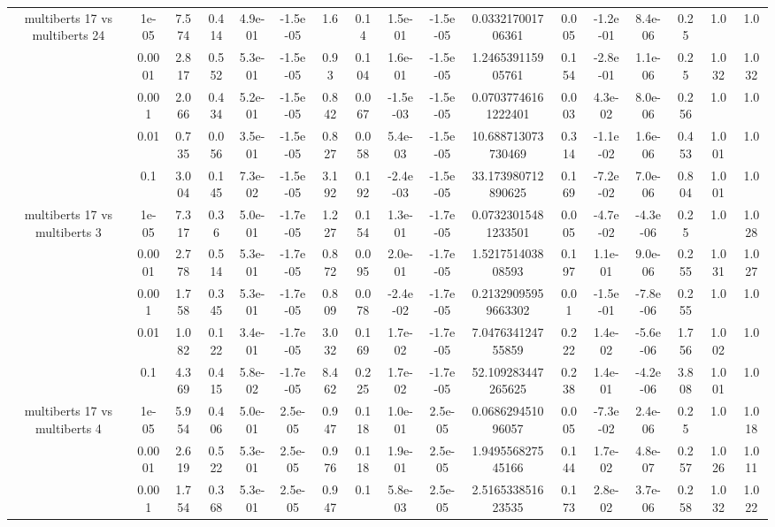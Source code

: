 \begin{tabular}{|c|c|c|c|c|c|c|c|c|c|c|c|c|c|c|c|c|}
\hline
\multirow{5}{*}{multiberts 17 vs multiberts 24} & 1e-05 & 7.574 & 0.414 & 4.9e-01 & -1.5e-05 & 1.6 & 0.14 & 1.5e-01 & -1.5e-05 & 0.033217001706361 & 0.005 & -1.2e-01 & 8.4e-06 & 0.25 & 1.0 & 1.0 \\
 & 0.0001 & 2.817 & 0.552 & 5.3e-01 & -1.5e-05 & 0.93 & 0.104 & 1.6e-01 & -1.5e-05 & 1.246539115905761 & 0.154 & -2.8e-01 & 1.1e-06 & 0.25 & 1.032 & 1.032 \\
 & 0.001 & 2.066 & 0.434 & 5.2e-01 & -1.5e-05 & 0.842 & 0.067 & -1.5e-03 & -1.5e-05 & 0.07037746161222401 & 0.003 & 4.3e-02 & 8.0e-06 & 0.256 & 1.0 & 1.0 \\
 & 0.01 & 0.735 & 0.056 & 3.5e-01 & -1.5e-05 & 0.827 & 0.058 & 5.4e-03 & -1.5e-05 & 10.688713073730469 & 0.314 & -1.1e-02 & 1.6e-06 & 0.453 & 1.001 & 1.0 \\
 & 0.1 & 3.004 & 0.145 & 7.3e-02 & -1.5e-05 & 3.192 & 0.192 & -2.4e-03 & -1.5e-05 & 33.173980712890625 & 0.169 & -7.2e-02 & 7.0e-06 & 0.804 & 1.001 & 1.0 \\
\hline
\multirow{5}{*}{multiberts 17 vs multiberts 3} & 1e-05 & 7.317 & 0.36 & 5.0e-01 & -1.7e-05 & 1.227 & 0.154 & 1.3e-01 & -1.7e-05 & 0.07323015481233501 & 0.005 & -4.7e-02 & -4.3e-06 & 0.25 & 1.0 & 1.028 \\
 & 0.0001 & 2.778 & 0.514 & 5.3e-01 & -1.7e-05 & 0.872 & 0.095 & 2.0e-01 & -1.7e-05 & 1.521751403808593 & 0.197 & 1.1e-01 & 9.0e-06 & 0.255 & 1.031 & 1.027 \\
 & 0.001 & 1.758 & 0.345 & 5.3e-01 & -1.7e-05 & 0.809 & 0.078 & -2.4e-02 & -1.7e-05 & 0.21329095959663302 & 0.01 & -1.5e-01 & -7.8e-06 & 0.255 & 1.0 & 1.0 \\
 & 0.01 & 1.082 & 0.122 & 3.4e-01 & -1.7e-05 & 3.032 & 0.169 & 1.7e-02 & -1.7e-05 & 7.047634124755859 & 0.222 & 1.4e-02 & -5.6e-06 & 1.756 & 1.002 & 1.0 \\
 & 0.1 & 4.369 & 0.415 & 5.8e-02 & -1.7e-05 & 8.462 & 0.225 & 1.7e-02 & -1.7e-05 & 52.109283447265625 & 0.238 & 1.4e-01 & -4.2e-06 & 3.808 & 1.001 & 1.0 \\
\hline
\multirow{5}{*}{multiberts 17 vs multiberts 4} & 1e-05 & 5.954 & 0.406 & 5.0e-01 & 2.5e-05 & 0.947 & 0.118 & 1.0e-01 & 2.5e-05 & 0.068629451096057 & 0.005 & -7.3e-02 & 2.4e-06 & 0.25 & 1.0 & 1.018 \\
 & 0.0001 & 2.619 & 0.522 & 5.3e-01 & 2.5e-05 & 0.976 & 0.118 & 1.9e-01 & 2.5e-05 & 1.949556827545166 & 0.144 & 1.7e-02 & 4.8e-07 & 0.257 & 1.026 & 1.011 \\
 & 0.001 & 1.754 & 0.368 & 5.3e-01 & 2.5e-05 & 0.947 & 0.1 & 5.8e-03 & 2.5e-05 & 2.516533851623535 & 0.173 & 2.8e-02 & 3.7e-06 & 0.258 & 1.032 & 1.022 \\

\end{tabular}
